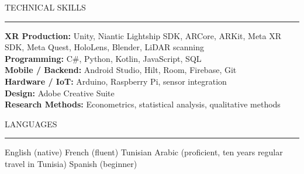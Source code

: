 \documentclass{resume} %
\renewenvironment{rSection}[1]{
  \needspace{4\baselineskip}
  \sectionskip
  \textcolor{CustomRed}{\MakeUppercase{#1}}
  \sectionlineskip
  \hrule
  \begin{list}{}{
    \setlength{\leftmargin}{1.5em}
  }
  \item[]
}{
  \end{list}
}
\begin{document}
\begin{rSection}{Technical Skills}
\textbf{XR Production:} Unity, Niantic Lightship SDK, ARCore, ARKit, Meta XR SDK, Meta Quest, HoloLens, Blender, LiDAR scanning\\
\textbf{Programming:} C\#, Python, Kotlin, JavaScript, SQL\\
\textbf{Mobile / Backend:} Android Studio, Hilt, Room, Firebase, Git\\
\textbf{Hardware / IoT:} Arduino, Raspberry Pi, sensor integration\\
\textbf{Design:} Adobe Creative Suite\\
\textbf{Research Methods:} Econometrics, statistical analysis, qualitative methods
\end{rSection}

\begin{rSection}{Languages}
English (native) \textbullet{} French (fluent) \textbullet{} Tunisian Arabic (proficient, ten years regular travel in Tunisia) \textbullet{} Spanish (beginner)
\end{rSection}
\end{document}
